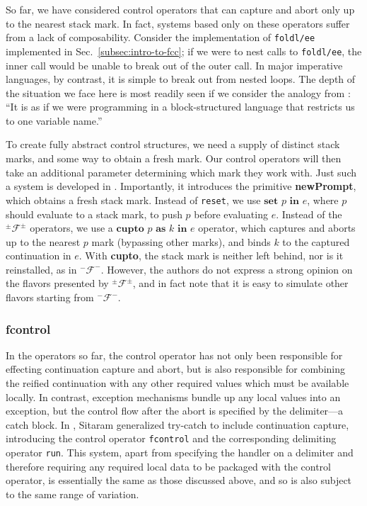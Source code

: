 \documentclass[11pt]{article}
\newcommand{\maybePage}{\newpage}
\newcommand\F{\mathcal{F}}
\newcommand\pmFpm{^\pm\F^\pm}
\begin{document}
So far, we have considered control operators that can capture and abort only up to the nearest stack mark.
In fact, systems based only on these operators suffer from a lack of composability.
Consider the implementation of \texttt{foldl/ee} implemented in Sec.~\ref{subsec:intro-to-fcc}; if we were to nest calls to \texttt{foldl/ee}, the inner call would be unable to break out of the outer call.
In major imperative languages, by contrast, it is simple to break out from nested loops.
The depth of the situation we face here is most readily seen if we consider the analogy from \cite{ContinuationsAndConcurrency}: ``It is as if we were programming in a block-structured language that restricts us to one variable name.''

To create fully abstract control structures, we need a supply of distinct stack marks, and some way to obtain a fresh mark.
Our control operators will then take an additional parameter determining which mark they work with.
Just such a system is developed in \cite{Gunter:1995}.
Importantly, it introduces the primitive \textbf{newPrompt}, which obtains a fresh stack mark.
Instead of \texttt{reset}, we use $\textbf{set }p\textbf{ in }e$, where $p$ should evaluate to a stack mark, to push $p$ before evaluating $e$.
Instead of the $\pmFpm$ operators, we use a $\textbf{cupto }p\textbf{ as }k\textbf{ in }e$ operator, which captures and aborts up to the nearest $p$ mark (bypassing other marks), and binds $k$ to the captured continuation in $e$.
With \textbf{cupto}, the stack mark is neither left behind, nor is it reinstalled, as in $^-\mathcal{F}^-$.
However, the authors do not express a strong opinion on the flavors presented by $\pmFpm$, and in fact note that it is easy to simulate other flavors starting from $^-\mathcal{F}^-$.

\maybePage
\subsubsection{fcontrol}

In the operators so far, the control operator has not only been responsible for effecting continuation capture and abort, but is also responsible for combining the reified continuation with any other required values which must be available locally.
In contrast, exception mechanisms bundle up any local values into an exception, but the control flow after the abort is specified by the delimiter---a catch block.
In \cite{HandlingControl}, Sitaram generalized try-catch to include continuation capture, introducing the control operator \texttt{fcontrol} and the corresponding delimiting operator \texttt{run}.
This system, apart from specifying the handler on a delimiter and therefore requiring any required local data to be packaged with the control operator, is essentially the same as those discussed above, and so is also subject to the same range of variation.
\end{document}
